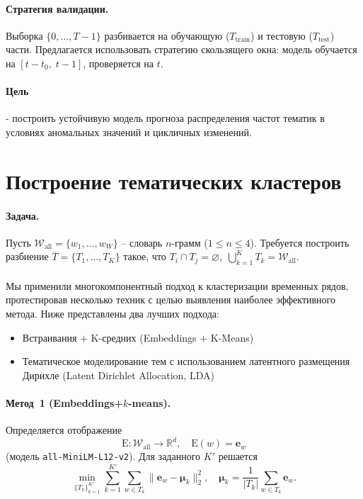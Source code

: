 \documentclass[14pt,a4paper]{article}
\begin{document}
\paragraph{Стратегия валидации.} Выборка $\{0, \ldots, T{-}1\}$ разбивается на обучающую ($T_{\mathrm{train}}$) и тестовую ($T_{\mathrm{test}}$) части. Предлагается использовать стратегию скользящего окна: модель обучается на $[t{-}t_0,\;t{-}1]$, проверяется на $t$.

\paragraph{Цель} - построить устойчивую модель прогноза распределения частот тематик в условиях аномальных значений и цикличных изменений.

\newpage
\section{Построение тематических кластеров}
\label{ssec:cluster_build}

\paragraph{Задача.}
Пусть $\mathcal{W}_{\mathrm{all}}=\{w_1,\dots,w_{W}\}$ – словарь $n$-грамм ($1\le n\le4$).
Требуется построить разбиение
\(
  \overline{T}=\{T_1,\dots,T_{K}\}
\)
такое, что
\(
  T_i\cap T_j=\varnothing,\;
  \bigcup_{k=1}^{K}T_k=\mathcal{W}_{\mathrm{all}}.
\)

\paragraph{}
Мы применили многокомпонентный подход к кластеризации временных рядов, протестировав несколько техник с целью выявления наиболее эффективного метода. Ниже представлены два лучших подхода:

\begin{itemize}
\item Встраивания + K-средних (Embeddings + K-Means)
\item Тематическое моделирование тем с использованием латентного размещения Дирихле (Latent Dirichlet Allocation, LDA)
\end{itemize}


\paragraph{Метод~1 (Embeddings+$k$-means).}
Определяется отображение
\[
  \mathrm{E}:\mathcal{W}_{\mathrm{all}}\to\mathbb{R}^{d},
  \quad
  \mathrm{E}(w)=\mathbf e_w
\]
(модель \texttt{all-MiniLM-L12-v2}).  
Для заданного $K'$ решается
\[
  \min_{\{T_k\}_{k=1}^{K'}}
  \sum_{k=1}^{K'}\sum_{w\in T_k}\bigl\|\mathbf e_w-\boldsymbol\mu_k\bigr\|_2^{2},
  \quad
  \boldsymbol\mu_k=\frac{1}{|T_k|}\sum_{w\in T_k}\mathbf e_w.
\]
\end{document}
